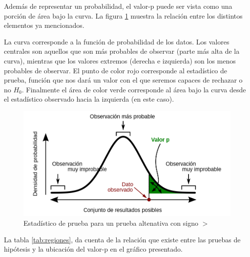 \documentclass[
  11pt,
]{book}
\theoremstyle{definition}
\theoremstyle{definition}
\theoremstyle{definition}
\theoremstyle{definition}
\theoremstyle{remark}
\begin{document}
Además de representar un probabilidad, el valor-p puede ser vista como una porción de área bajo la curva. La figura \ref{fig:graficovalorp} muestra la relación entre los distintos elementos ya mencionados.

La curva corresponde a la función de probabilidad de los datos. Los valores centrales son aquellos que son más probables de observar (parte más alta de la curva), mientras que los valores extremos (derecha e izquierda) son los menos probables de observar. El punto de color rojo corresponde al estadístico de prueba, función que nos dará un valor con el que seremos capaces de rechazar o no \(H_0\). Finalmente el área de color verde corresponde al área bajo la curva desde el estadístico observado hacia la izquierda (en este caso).

\begin{figure}

{\centering \includegraphics[width=0.7\linewidth]{material/img/Valor_p} 

}

\caption{Estadístico de prueba para un prueba altenativa con signo $>$}\label{fig:graficovalorp}
\end{figure}

La tabla \ref{tab:regiones}, da cuenta de la relación que existe entre las pruebas de hipótesis y la ubicación del valor-p en el gráfico presentado.

\begin{table}[H]
\centering
\caption{\label{tab:regiones}Hipótesis alternativa, valor-p y estadístico de prueba}
\centering
{}
\end{table}
\end{document}
